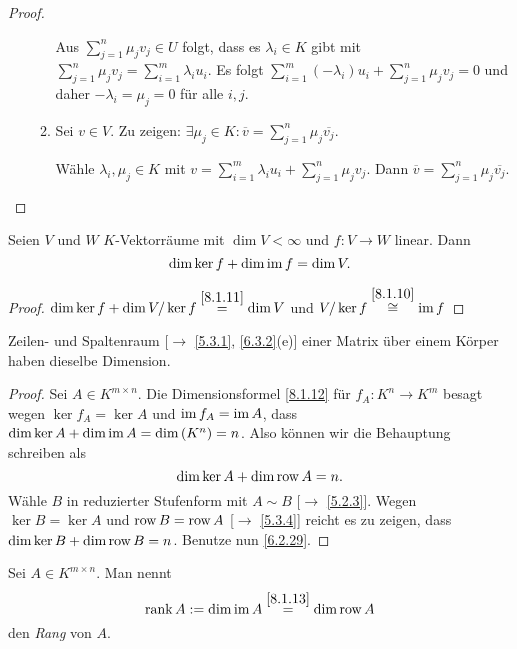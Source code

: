 \documentclass[../../main.tex]{subfiles}
\begin{document}
\begin{proof}
\begin{itemize}
\begin{enumerate}[Zu (a).]
Aus $\sum_{j = 1}^{n}\mu_j v_j \in U$ folgt, dass es $\lambda_i\in K$ gibt mit $\sum_{j = 1}^{n}\mu_j v_j = \sum_{i = 1}^{m}\lambda_i u_i$. Es folgt $\sum_{i = 1}^{m}(-\lambda_i)u_i+\sum_{j = 1}^{n}\mu_j v_j = 0$ und daher $-\lambda_i = \mu_j = 0$ für alle $i,j$.
\item Sei $v\in V$. Zu zeigen: $\exists \mu_j\in K:\overline{v} = \sum_{j = 1}^{n}\mu_j \overline{v_j}$.

Wähle $\lambda_i,\mu_j\in K$ mit $v = \sum_{i = 1}^{m}\lambda_iu_i + \sum_{j = 1}^{n}\mu_j v_j$. Dann $\overline{v} = \sum_{j = 1}^{n} \mu_j \overline{v_j}$.
\end{enumerate}
\end{itemize}
\end{proof}

\begin{sat}\label{8.1.12}
Seien $V$ und $W$ $K$-Vektorräume mit $\dim V <\infty$ und $f:V\to W$ linear. Dann \[\dim \ker f + \dim \operatorname{im} f = \dim V.\]
\end{sat}
\begin{proof}
$\dim \ker f + \dim V/\ker f \overset{\ref{8.1.11}}{=} \dim V$ und $V/\ker f\overset{\ref{8.1.10}}{\cong} \operatorname{im} f$
\end{proof}

\begin{kor}\label{8.1.13}
Zeilen- und Spaltenraum {\rm[$\to$ \ref{5.3.1}, \ref{6.3.2}(e)]} einer Matrix über einem Körper haben dieselbe Dimension.
\end{kor}
\begin{proof}
Sei $A\in K^{m\times n}$. Die Dimensionsformel \ref{8.1.12} für $f_A\colon K^n\to K^m$ besagt wegen $\ker f_A = \ker A$ und $\operatorname{im} f_A = \operatorname{im} A$, dass $\dim \ker A + \dim \operatorname{im} A = \dim \left(K^n\right) = n$. Also können wir die Behauptung schreiben als
$$\dim \ker A + \dim \operatorname{row} A = n.$$
Wähle $B$ in reduzierter Stufenform mit $A\sim B$ [$\to$ \ref{5.2.3}]. Wegen $\ker B = \ker A$ und $\operatorname{row} B = \operatorname{row} A$ [$\to$ \ref{5.3.4}] reicht es zu zeigen, dass $\dim \ker B + \dim \operatorname{row} B = n$. Benutze nun \ref{6.2.29}.
\end{proof}

\begin{df}\label{8.1.14}
Sei $A\in K^{m\times n}$. Man nennt \[\operatorname{rank} A := \dim \operatorname{im} A \overset{\ref{8.1.13}}{=} \dim \operatorname{row} A\] den \emph{Rang} von $A$.
\end{df}
\end{document}
